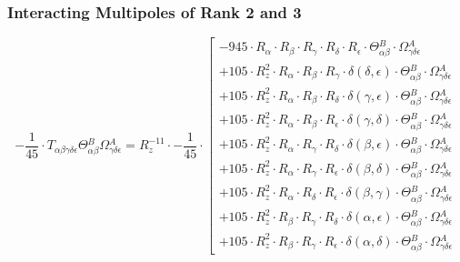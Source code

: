 \documentclass{article}
\begin{document}
\subsubsection*{Interacting Multipoles of Rank 2 and 3}
\begin{equation}
- \frac{1}{45} \cdot T_{\alpha{}\beta{}\gamma{}\delta{}\epsilon{}} \Theta{}^{B}_{\alpha{}\beta{}} \Omega{}^{A}_{\gamma{}\delta{}\epsilon{}} = R_{z}^{-11} \cdot - \frac{1}{45} \cdot  \left[ \begin{array}{c} 
 		- 945 \cdot R_{\alpha{}} \cdot R_{\beta{}} \cdot R_{\gamma{}} \cdot R_{\delta{}} \cdot R_{\epsilon{}} \cdot \Theta{}^{B}_{\alpha{}\beta{}} \cdot \Omega{}^{A}_{\gamma{}\delta{}\epsilon{}} 
 \\[0.2em] 		 + 105 \cdot R_{z}^{2} \cdot R_{\alpha{}} \cdot R_{\beta{}} \cdot R_{\gamma{}} \cdot \delta{}\left(\delta{}, \epsilon{}\right) \cdot \Theta{}^{B}_{\alpha{}\beta{}} \cdot \Omega{}^{A}_{\gamma{}\delta{}\epsilon{}} 
 \\[0.2em] 		 + 105 \cdot R_{z}^{2} \cdot R_{\alpha{}} \cdot R_{\beta{}} \cdot R_{\delta{}} \cdot \delta{}\left(\gamma{}, \epsilon{}\right) \cdot \Theta{}^{B}_{\alpha{}\beta{}} \cdot \Omega{}^{A}_{\gamma{}\delta{}\epsilon{}} 
 \\[0.2em] 		 + 105 \cdot R_{z}^{2} \cdot R_{\alpha{}} \cdot R_{\beta{}} \cdot R_{\epsilon{}} \cdot \delta{}\left(\gamma{}, \delta{}\right) \cdot \Theta{}^{B}_{\alpha{}\beta{}} \cdot \Omega{}^{A}_{\gamma{}\delta{}\epsilon{}} 
 \\[0.2em] 		 + 105 \cdot R_{z}^{2} \cdot R_{\alpha{}} \cdot R_{\gamma{}} \cdot R_{\delta{}} \cdot \delta{}\left(\beta{}, \epsilon{}\right) \cdot \Theta{}^{B}_{\alpha{}\beta{}} \cdot \Omega{}^{A}_{\gamma{}\delta{}\epsilon{}} 
 \\[0.2em] 		 + 105 \cdot R_{z}^{2} \cdot R_{\alpha{}} \cdot R_{\gamma{}} \cdot R_{\epsilon{}} \cdot \delta{}\left(\beta{}, \delta{}\right) \cdot \Theta{}^{B}_{\alpha{}\beta{}} \cdot \Omega{}^{A}_{\gamma{}\delta{}\epsilon{}} 
 \\[0.2em] 		 + 105 \cdot R_{z}^{2} \cdot R_{\alpha{}} \cdot R_{\delta{}} \cdot R_{\epsilon{}} \cdot \delta{}\left(\beta{}, \gamma{}\right) \cdot \Theta{}^{B}_{\alpha{}\beta{}} \cdot \Omega{}^{A}_{\gamma{}\delta{}\epsilon{}} 
 \\[0.2em] 		 + 105 \cdot R_{z}^{2} \cdot R_{\beta{}} \cdot R_{\gamma{}} \cdot R_{\delta{}} \cdot \delta{}\left(\alpha{}, \epsilon{}\right) \cdot \Theta{}^{B}_{\alpha{}\beta{}} \cdot \Omega{}^{A}_{\gamma{}\delta{}\epsilon{}} 
 \\[0.2em] 		 + 105 \cdot R_{z}^{2} \cdot R_{\beta{}} \cdot R_{\gamma{}} \cdot R_{\epsilon{}} \cdot \delta{}\left(\alpha{}, \delta{}\right) \cdot \Theta{}^{B}_{\alpha{}\beta{}} \cdot \Omega{}^{A}_{\gamma{}\delta{}\epsilon{}} 

\end{array}
\end{equation}
\end{document}
